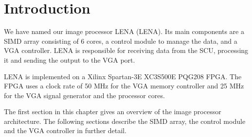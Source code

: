 \section{Introduction}

We have named our image processor \acs{LENA} (\acl{LENA}). Its main
components are a \ac{SIMD} array consisting of 6 cores, a control module
to manage the data, and a \ac{VGA} controller. \ac{LENA} is responsible
for receiving data from the SCU, processing it and sending the output to
the \ac{VGA} port.

LENA is implemented on a Xilinx Spartan-3E XC3S500E PQG208 FPGA. The
FPGA uses a clock rate of 50 MHz for the VGA memory controller and 25
MHz for the VGA signal generator and the processor cores.

The first section in this chapter gives an overview of the image
processor architecture. The following sections describe the SIMD array,
the control module and the VGA controller in further detail.
